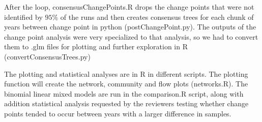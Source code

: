 \documentclass{article}\usepackage[]{graphicx}\usepackage[]{color}
\begin{document}
After the loop, consensusChangePoints.R drops the change points that
were not identified by $95\%$ of the runs and then creates consensus
trees for each chunk of years between change point in python
(postChangePoint.py). The outputs of the change point analysis were
very specialized to that analysis, so we had to convert them to .glm
files for plotting and further exploration in R
(convertConsensusTrees.py)

The plotting and statistical analyses are in R in different
scripts. The plotting function will create the network, community and
flow plots (networks.R). The binomial linear mixed models are run in
the comparison.R script, along with addition statistical analysis
requested by the reviewers testing whether change points tended to
occur between years with a larger difference in samples.
\end{document}
